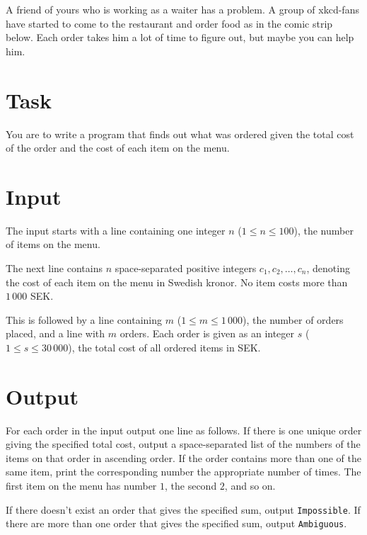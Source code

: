 A friend of yours who is working as a waiter has a problem. A group of xkcd-fans have started to come to the
restaurant and order food as in the comic strip below. Each order takes him a lot of time to figure out, but maybe
you can help him.

\section*{Task}
You are to write a program that finds out what was ordered given the total cost of the order and the cost of each
item on the menu.

\section*{Input}
The input starts with a line containing one integer $n$ ($1 \le n \le 100$), the number of items on the menu.

The next line contains $n$ space-separated positive integers $c_1, c_2,\dots, c_n$, denoting the cost of each item on the menu in Swedish kronor.
No item costs more than $1\,000$ SEK.

This is followed by a line containing $m$ ($1 \le m \le 1\,000$), the number of orders placed, and a line with $m$ orders.
Each order is given as an integer $s$ ($1 \le s \le 30\,000$), the total cost of all ordered items in SEK.

\section*{Output}
For each order in the input output one line as follows.
If there is one unique order giving the specified total cost, output a space-separated list of the numbers of the items on that order in ascending order.
If the order contains more than one of the same item, print the corresponding number the appropriate number of times.
The first item on the menu has number $1$, the second $2$, and so on.

If there doesn't exist an order that gives the specified sum, output \texttt{Impossible}.
If there are more than one order that gives the specified sum, output \texttt{Ambiguous}.
